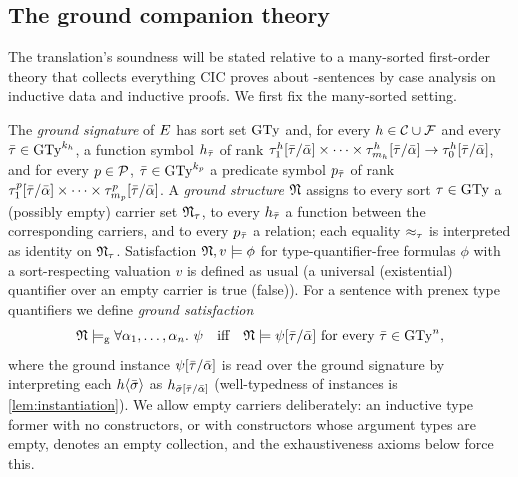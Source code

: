 \subsection{The ground companion theory}
\label{subsec:companion}

The translation's soundness will be stated relative to a many-sorted
first-order theory that collects everything CIC proves about
\Frag-sentences by case analysis on inductive data and inductive proofs.
We first fix the many-sorted setting.

\begin{definition}
  \label{def:ms-structures}
  The \emph{ground signature} of $E$ has sort set $\mathrm{GTy}$ and, for every
  $h \in \mathcal{C} \cup \mathcal{F}$ and every $\bar{\tau} \in \mathrm{GTy}^{k_h}$, a function
  symbol $h_{\bar{\tau}}$ of rank
  $\tau^h_1[\bar{\tau}/\bar{\alpha}] \times \dots \times
  \tau^h_{m_h}[\bar{\tau}/\bar{\alpha}] \rightarrow \tau^h_0[\bar{\tau}/\bar{\alpha}]$,
  and for every $p \in \mathcal{P}$, $\bar{\tau} \in \mathrm{GTy}^{k_p}$ a predicate symbol
  $p_{\bar{\tau}}$ of rank
  $\tau^p_1[\bar{\tau}/\bar{\alpha}] \times \dots \times
  \tau^p_{m_p}[\bar{\tau}/\bar{\alpha}]$.  A \emph{ground structure} $\mathfrak{N}$
  assigns to every sort $\tau \in \mathrm{GTy}$ a (possibly empty) carrier set
  $\mathfrak{N}_\tau$, to every $h_{\bar{\tau}}$ a function between the corresponding
  carriers, and to every $p_{\bar{\tau}}$ a relation; each equality
  $\approx_{\tau}$ is interpreted as identity on $\mathfrak{N}_\tau$.  Satisfaction
  $\mathfrak{N}, v \models \phi$ for type-quantifier-free formulas $\phi$ with a
  sort-respecting valuation $v$ is defined as usual (a universal
  (existential) quantifier over an empty carrier is true (false)).  For a
  sentence with prenex type quantifiers we define \emph{ground
  satisfaction}
  \[
    \mathfrak{N} \models_{\mathrm{g}} \forall\alpha_1,\dots,\alpha_{n}.\ \psi
    \quad\text{iff}\quad
    \mathfrak{N} \models \psi[\bar{\tau}/\bar{\alpha}]
    \ \text{for every } \bar{\tau} \in \mathrm{GTy}^n,
  \]
  where the ground instance $\psi[\bar{\tau}/\bar{\alpha}]$ is read over the
  ground signature by interpreting each
  $h\langle\bar{\sigma}\rangle$ as $h_{\bar{\sigma}[\bar{\tau}/\bar{\alpha}]}$
  (well-typedness of instances is \cref{lem:instantiation}).  We allow
  empty carriers deliberately: an inductive type former with no
  constructors, or with constructors whose argument types are empty, denotes
  an empty collection, and the exhaustiveness axioms below force this.
\end{definition}

